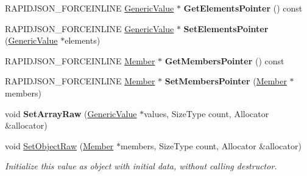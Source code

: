 \begin{DoxyCompactItemize}
\item 
\mbox{\label{classGenericValue_aea7b87806555825ab36ebaaff57440bf}} 
R\+A\+P\+I\+D\+J\+S\+O\+N\+\_\+\+F\+O\+R\+C\+E\+I\+N\+L\+I\+NE \hyperlink{classGenericValue}{Generic\+Value} $\ast$ {\bfseries Get\+Elements\+Pointer} () const
\item 
\mbox{\label{classGenericValue_ad8ac8518160251babea5065f9eea8982}} 
R\+A\+P\+I\+D\+J\+S\+O\+N\+\_\+\+F\+O\+R\+C\+E\+I\+N\+L\+I\+NE \hyperlink{classGenericValue}{Generic\+Value} $\ast$ {\bfseries Set\+Elements\+Pointer} (\hyperlink{classGenericValue}{Generic\+Value} $\ast$elements)
\item 
\mbox{\label{classGenericValue_a04412a15687feb103f917cdd91b32298}} 
R\+A\+P\+I\+D\+J\+S\+O\+N\+\_\+\+F\+O\+R\+C\+E\+I\+N\+L\+I\+NE \hyperlink{classGenericValue_a7ccf27c44058b4c11c3efc6473afb886}{Member} $\ast$ {\bfseries Get\+Members\+Pointer} () const
\item 
\mbox{\label{classGenericValue_a0b488cb0120b154eadde27dc0e694019}} 
R\+A\+P\+I\+D\+J\+S\+O\+N\+\_\+\+F\+O\+R\+C\+E\+I\+N\+L\+I\+NE \hyperlink{classGenericValue_a7ccf27c44058b4c11c3efc6473afb886}{Member} $\ast$ {\bfseries Set\+Members\+Pointer} (\hyperlink{classGenericValue_a7ccf27c44058b4c11c3efc6473afb886}{Member} $\ast$members)
\item 
\mbox{\label{classGenericValue_a8f5f309065479de40a16cf28a340da65}} 
void {\bfseries Set\+Array\+Raw} (\hyperlink{classGenericValue}{Generic\+Value} $\ast$values, Size\+Type count, Allocator \&allocator)
\item 
\mbox{\label{classGenericValue_a26c8ec7d68858df1038506df7fcff22d}} 
void \hyperlink{classGenericValue_a26c8ec7d68858df1038506df7fcff22d}{Set\+Object\+Raw} (\hyperlink{classGenericValue_a7ccf27c44058b4c11c3efc6473afb886}{Member} $\ast$members, Size\+Type count, Allocator \&allocator)
\begin{DoxyCompactList}\small\item\em Initialize this value as object with initial data, without calling destructor. \end{DoxyCompactList}\item 
\mbox{\label{classGenericValue_a1451603922dcdf34976f125dc60f70ee}} 

\end{DoxyCompactItemize}
